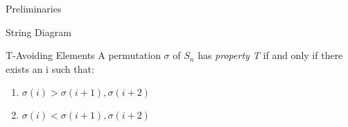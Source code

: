 \documentclass[11pt]{amsart}
\theoremstyle{definition}
\numberwithin{equation}{section}
\renewcommand{\(}{\left(}
\renewcommand{\)}{\right)}
\begin{document}
\begin{section}{Preliminaries}
\begin{subsection}{String Diagram}
\end{subsection}

\begin{subsection}{T-Avoiding Elements}
A permutation $\sigma$ of $S_n$ has \emph{property T} if and only if there exists an i such that:
\begin{enumerate}
\item $\sigma(i)>\sigma(i+1), \sigma(i+2)$\\
\item $\sigma(i)<\sigma(i+1), \sigma(i+2)$
\end{enumerate}

\color{red}{Insert pictures of T-avoiding string diagrams}
\end{subsection}

\end{section}














\end{document}
